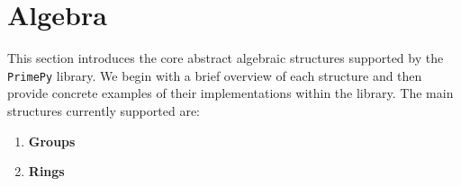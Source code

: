 \section{Algebra}

This section introduces the core abstract algebraic structures supported by the \texttt{PrimePy} library. We begin with a brief overview of each structure and then provide concrete examples of their implementations within the library.
\newline
\newline
The main structures currently supported are:

\begin{enumerate}
  \item \textbf{Groups}
  \item \textbf{Rings}
\end{enumerate}